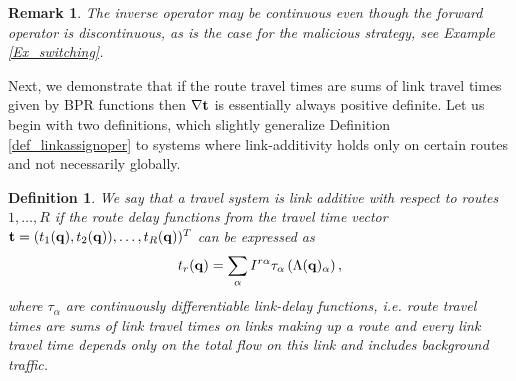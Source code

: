 \documentclass[a4paper,11pt]{article}
\newtheorem{definition}[theorem]{Definition}
\newtheorem{remark}[theorem]{Remark}
\begin{document}
\begin{remark}
The inverse operator may be continuous even though the forward operator is discontinuous, as is the case for the malicious strategy, see Example \ref{Ex_switching}. 
\end{remark}


Next, we demonstrate that if the route travel times are sums of link travel times given by BPR functions then $\bold{\nabla t}$ is essentially always positive definite. Let us begin with two definitions, which slightly generalize Definition  \ref{def_linkassignoper} to systems where link-additivity holds only on certain routes and not necessarily globally.

\begin{definition}
\label{def_linkadditive}
We say that a travel system is \emph{link additive} with respect to routes $1,\dots, R$ if the route delay functions from the travel time vector $\bold{t} = (t_1(\bold{q}), t_2(\bold{q})), \dots, t_R(\bold{q}))^T$ can be expressed as 
\begin{equation*}
t_r(\bold{q}) = \sum_{\alpha} I^{r\alpha} \tau_\alpha\left(\Lambda(\bold{q})_\alpha\right),
\end{equation*}
where $\tau_\alpha$ are continuously differentiable link-delay functions, i.e.  route travel times are sums of link travel times on links making up a route and every link travel time depends only on the total flow on this link and includes background traffic.\end{definition}
\end{document}

